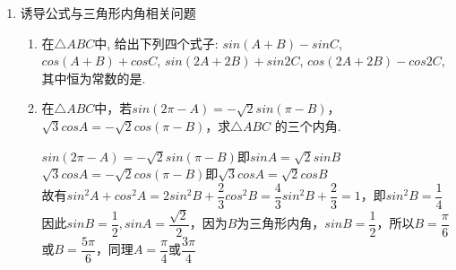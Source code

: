 \begin{enumerate}
\begin{enumerate}
\begin{jieda}
            $sin^2(42^{\circ} + \alpha) + sin^2(48^{\circ}-\alpha) = sin^2(42^{\circ} + \alpha) + cos^2(42^{\circ} + \alpha) = 1$ \\
            $cot(25^{\circ} + \beta)cot(\beta-65^{\circ}) = cot(25^{\circ} + \beta)tan(155^{\circ} - \beta) = cot(25^{\circ} + \beta)(-tan(25^{\circ} + \beta)) = -1$ \\
            故原式$= 0$
        \end{jieda}
        \item 若函数$f(x) = asin(\pi x+ \alpha) + b cos(\pi x + \beta)$，且满足$f(1997) = -1$，则$f(1998) = $
        \begin{jieda}
            设$A = 1997 \pi + \alpha, B = 1997 \pi + \beta$，故$f(1997) = asin(A) + bcos(B)$，因此$f(1998) = asin(A+\pi) + bcos(B+\pi) = -asin(A) - b cos(B) = -f(1997) = 1$.
        \end{jieda}
        \item 已知$sin\beta=\dfrac{1}{3}$, $sin(\alpha+\beta)=0$, 则$sin(2\alpha+\beta)$=. 
        \begin{jieda}
        $sin(\alpha+\beta)=0\iff\alpha+\beta=k\pi, k \in \mathbf{Z}$，故 $sin(2\alpha+\beta) = sin(2(\alpha+\beta) - \beta) = sin(-\beta) = -sin\beta = -\dfrac{1}{3}$
        \end{jieda}
    \end{enumerate}
    \item 诱导公式与三角形内角相关问题
    \begin{enumerate}
        \item 在$\triangle{ABC}$中, 给出下列四个式子: 
             $sin(A+B)-sin{C}$, 
             $cos(A+B)+cos{C}$, 
             $sin(2A+2B)+sin2C$, 
             $cos(2A+2B)-cos2C$, 其中恒为常数的是.
        \item 在$\triangle ABC$中，若$sin(2\pi - A) = -\sqrt{2}sin(\pi - B)$，$\sqrt{3}cosA = -\sqrt{2}cos(\pi - B)$，求$\triangle ABC$ 的三个内角.
        \begin{jieda}
            $sin(2\pi - A) = -\sqrt{2}sin(\pi - B)$即$sinA =\sqrt{2}sinB$ \\
            $\sqrt{3}cosA = -\sqrt{2}cos(\pi - B)$即$\sqrt{3}cosA = \sqrt{2}cosB$ \\
            故有$sin^2A + cos^2A = 2sin^2B + \dfrac{2}{3}cos^2B = \dfrac{4}{3}sin^2B + \dfrac{2}{3} = 1$，即$sin^2B = \dfrac{1}{4}$ \\
            因此$sinB = \dfrac{1}{2}, sinA = \dfrac{\sqrt{2}}{2}$，因为$B$为三角形内角，$sinB = \dfrac{1}{2}$，所以$B = \dfrac{\pi}{6}$或$B = \dfrac{5\pi}{6}$，同理$A = \dfrac{\pi}{4}$或$\dfrac{3\pi}{4}$ \\

\end{jieda}
\end{enumerate}
\end{enumerate}
